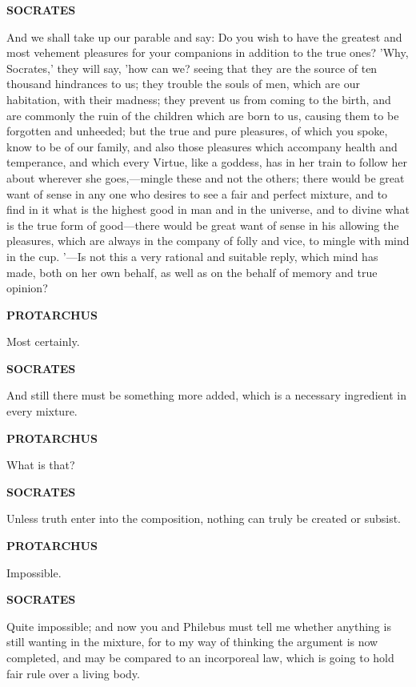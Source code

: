 \documentclass[11pt,letter]{article}
\begin{document}
\par \textbf{SOCRATES}
\par   And we shall take up our parable and say:  Do you wish to have the greatest and most vehement pleasures for your companions in addition to the true ones? 'Why, Socrates,' they will say, 'how can we? seeing that they are the source of ten thousand hindrances to us; they trouble the souls of men, which are our habitation, with their madness; they prevent us from coming to the birth, and are commonly the ruin of the children which are born to us, causing them to be forgotten and unheeded; but the true and pure pleasures, of which you spoke, know to be of our family, and also those pleasures which accompany health and temperance, and which every Virtue, like a goddess, has in her train to follow her about wherever she goes,—mingle these and not the others; there would be great want of sense in any one who desires to see a fair and perfect mixture, and to find in it what is the highest good in man and in the universe, and to divine what is the true form of good—there would be great want of sense in his allowing the pleasures, which are always in the company of folly and vice, to mingle with mind in the cup. '—Is not this a very rational and suitable reply, which mind has made, both on her own behalf, as well as on the behalf of memory and true opinion?

\par \textbf{PROTARCHUS}
\par   Most certainly.

\par \textbf{SOCRATES}
\par   And still there must be something more added, which is a necessary ingredient in every mixture.

\par \textbf{PROTARCHUS}
\par   What is that?

\par \textbf{SOCRATES}
\par   Unless truth enter into the composition, nothing can truly be created or subsist.

\par \textbf{PROTARCHUS}
\par   Impossible.

\par \textbf{SOCRATES}
\par   Quite impossible; and now you and Philebus must tell me whether anything is still wanting in the mixture, for to my way of thinking the argument is now completed, and may be compared to an incorporeal law, which is going to hold fair rule over a living body.
\end{document}

